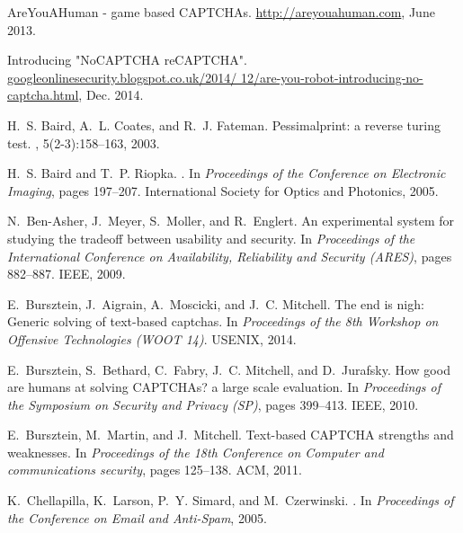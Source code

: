 \documentclass[conference]{IEEEtran}
\begin{document}
\begin{thebibliography}{10}

{A}re{Y}ou{AH}uman - game based {CAPTCHA}s.
\newblock \url{http://areyouahuman.com}, June 2013.

Introducing {"NoCAPTCHA reCAPTCHA"}.
\newblock \url{googleonlinesecurity.blogspot.co.uk/2014/
  12/are-you-robot-introducing-no-captcha.html}, Dec. 2014.

H.~S. Baird, A.~L. Coates, and R.~J. Fateman.
\newblock Pessimalprint: a reverse turing test.
,
  5(2-3):158--163, 2003.

H.~S. Baird and T.~P. Riopka.
.
\newblock In {\em Proceedings of the Conference on Electronic Imaging}, pages
  197--207. International Society for Optics and Photonics, 2005.

N.~Ben-Asher, J.~Meyer, S.~Moller, and R.~Englert.
\newblock An experimental system for studying the tradeoff between usability
  and security.
\newblock In {\em Proceedings of the International Conference on Availability,
  Reliability and Security (ARES)}, pages 882--887. IEEE, 2009.

E.~Bursztein, J.~Aigrain, A.~Moscicki, and J.~C. Mitchell.
\newblock The end is nigh: Generic solving of text-based captchas.
\newblock In {\em Proceedings of the 8th Workshop on Offensive Technologies
  (WOOT 14)}. USENIX, 2014.

E.~Bursztein, S.~Bethard, C.~Fabry, J.~C. Mitchell, and D.~Jurafsky.
\newblock How good are humans at solving {CAPTCHA}s? a large scale evaluation.
\newblock In {\em Proceedings of the Symposium on Security and Privacy (SP)},
  pages 399--413. IEEE, 2010.

E.~Bursztein, M.~Martin, and J.~Mitchell.
\newblock Text-based {CAPTCHA} strengths and weaknesses.
\newblock In {\em Proceedings of the 18th Conference on Computer and
  communications security}, pages 125--138. ACM, 2011.

K.~Chellapilla, K.~Larson, P.~Y. Simard, and M.~Czerwinski.
.
\newblock In {\em Proceedings of the Conference on Email and Anti-Spam}, 2005.


\end{thebibliography}
\end{document}
